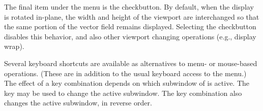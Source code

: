 The final item under the  menu is the
 checkbutton.  By default, when the
display is rotated in-plane, the width and height of the viewport are
interchanged so that the same portion of the vector field remains
displayed.  Selecting the  checkbutton
disables this behavior, and also other viewport changing operations
(e.g., display wrap).

Several keyboard shortcuts are available as alternatives to menu- or
mouse-based operations.  (These are in addition to the usual keyboard
access to the menu.)  The effect of a key combination depends on which
subwindow of  is active.  The  key may be used to
change the active subwindow.  The  key combination also
changes the active subwindow, in reverse order.

